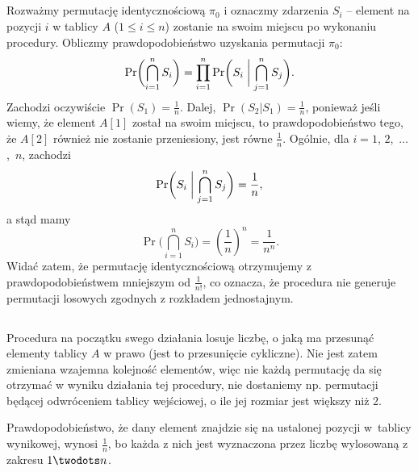 \subsection{} %
\subsection{} %
Rozważmy permutację identycznościową $\pi_0$ i oznaczmy zdarzenia $S_i$ -- element na pozycji $i$ w tablicy $A$ ($1\le i\le n$) zostanie na swoim miejscu po wykonaniu procedury. Obliczmy prawdopodobieństwo uzyskania permutacji $\pi_0$:
\[
	\Pr\biggl(\bigcap_{i=1}^nS_i\biggr) = \prod_{i=1}^n\Pr\biggl(S_i\biggm|\bigcap_{j=1}^nS_j\biggr).
\]
Zachodzi oczywiście $\Pr(S_1)=\frac{1}{n}$. Dalej, $\Pr(S_2|S_1)=\frac{1}{n}$, ponieważ jeśli wiemy, że element $A[1]$ został na swoim miejscu, to prawdopodobieństwo tego, że $A[2]$ również nie zostanie przeniesiony, jest równe $\frac{1}{n}$. Ogólnie, dla $i=1$, $2$,~$\dots$,~$n$, zachodzi
\[
	\Pr\biggl(S_i\biggm|\bigcap_{j=1}^nS_j\biggr) = \frac{1}{n},
\]
a stąd mamy
\[
	\Pr\biggl(\bigcap_{i=1}^nS_i\biggr) = \left(\frac{1}{n}\right)^n = \frac{1}{n^n}.
\]
Widać zatem, że permutację identycznościową otrzymujemy z prawdopodobieństwem mniejszym od $\frac{1}{n!}$, co oznacza, że procedura  nie generuje permutacji losowych zgodnych z rozkładem jednostajnym.

\subsection{} %
Procedura na początku swego działania losuje liczbę, o jaką ma przesunąć elementy tablicy $A$ w prawo (jest to przesunięcie cykliczne). Nie jest zatem zmieniana wzajemna kolejność elementów, więc nie każdą permutację da się otrzymać w wyniku działania tej procedury, nie dostaniemy np. permutacji będącej odwróceniem tablicy wejściowej, o ile jej rozmiar jest większy niż 2.

Prawdopodobieństwo, że dany element znajdzie się na ustalonej pozycji w~tablicy wynikowej, wynosi $\frac{1}{n}$, bo każda z nich jest wyznaczona przez liczbę wylosowaną z zakresu $1\twodots n$.

